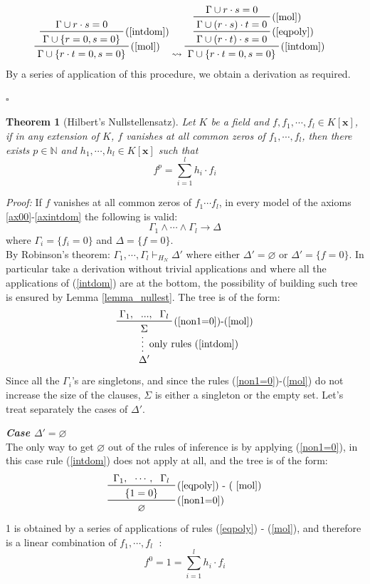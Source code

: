\documentclass[a4paper,12pt,oneside]{book}
\newtheorem{theorem}{Theorem}[chapter]
\newcommand*{\QED}{\hfill\ensuremath{\square}}
\let\emptyset\varnothing
\let\e\wedge
\begin{document}
\begin{eqnarray*}
\prftree[r]{(\ref{mol})} { \prftree[r]{(\ref{intdom})} {\Gamma \cup  r\cdot s=0} {\Gamma \cup  \{r=0, s=0\}} } {\Gamma \cup \{r\cdot t=0, s=0\}}
&  \leadsto 
\prftree[r]{(\ref{intdom})} 
{ \prftree[r]{(\ref{eqpoly})} 
{\prftree[r]{(\ref{mol})}
{\Gamma \cup r\cdot s=0}
{\Gamma\cup (r\cdot s) \cdot t=0 } } 
{\Gamma \cup  (r\cdot t) \cdot s=0} } 
{\Gamma \cup \{r\cdot t=0, s=0\}}
\end{eqnarray*}
By a series of application of this procedure, we obtain a derivation as required. 

\QED

\begin{theorem}[Hilbert's Nullstellensatz]
Let $K$ be a field and $f,f_1,\cdots, f_l \in K[\mathbf{x}]$, if in any extension of $K$, $f$ vanishes at all common zeros of $f_1,\cdots, f_l$, then there exists $p\in \mathbb{N}$ and $h_1,\cdots, h_l \in K[\mathbf{x}]$ such that
$$
f^p = \sum_{i=1}^l h_i \cdot f_i
$$
\end{theorem}
\newpage
\textit{Proof: }If $f$ vanishes at all common zeros of $f_1\cdots f_l$, in every model of the axioms \ref{ax00}-\ref{axintdom} the following is valid:
$$ \Gamma_1\e\cdots\e\Gamma_l\rightarrow\Delta$$
where $\Gamma_i=\{f_i=0\}$ and $\Delta =\{f=0\}$.\\ By Robinson's theorem: $\Gamma_1,\cdots ,\Gamma_l \vdash_{H_N} \Delta '$ where either $\Delta '=\emptyset$ or $\Delta '=\{f=0\}$. 
In particular take a derivation without trivial applications and where all the applications of (\ref{intdom}) are at the bottom, the possibility of building such tree is ensured by Lemma \ref{lemma_nullest}. The tree is of the form:
\begin{equation*}
\prfsummary[only rules (\ref{intdom})] {\prftree[r]{(\ref{non1=0})-(\ref{mol})}{\Gamma_1,}{...,}{\Gamma_l}{\Sigma}}{\Delta '}
\end{equation*}
Since all the $\Gamma_i$'s are singletons, and since the rules (\ref{non1=0})-(\ref{mol}) do not increase the size of the clauses, $\Sigma$ is either a singleton or the empty set. Let's treat separately the cases of $\Delta '$.

\textbf{\emph{Case $\Delta '=\emptyset$}} \\
The only way to get $\emptyset$ out of the rules of inference is by applying (\ref{non1=0}), in this case rule (\ref{intdom}) does not apply at all, and the tree is of the form: 
$$
\prftree[r]{(\ref{non1=0})}
{ \prftree[r]{(\ref{eqpoly}) - ( \ref{mol})}
{ \Gamma_1, }{\cdots ,}{\Gamma_l}
{\hspace{5mm}\{1=0\}\hspace{5mm}} 
}
{\emptyset }
$$
1 is obtained by a series of applications of rules (\ref{eqpoly}) - (\ref{mol}), and therefore is a linear  combination of $f_1,\cdots ,f_l\;$ : 
$$f^0=1 = \sum_{i=1}^l h_i \cdot f_i$$
\end{document}
